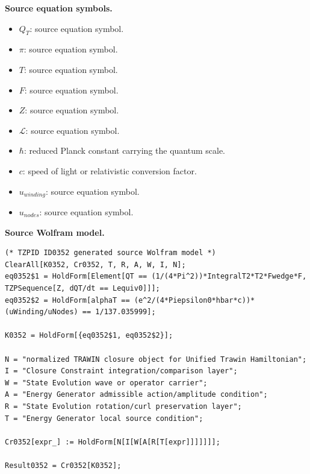 \begin{minipage}[t]{0.49\linewidth}
\begingroup
\small
\raggedright
\textbf{Source equation symbols.}\par
\begin{itemize}[leftmargin=1.35em,itemsep=1pt,topsep=1pt,parsep=0pt]
    \item $Q_T$: source equation symbol.
    \item $\pi$: source equation symbol.
    \item $T$: source equation symbol.
    \item $F$: source equation symbol.
    \item $Z$: source equation symbol.
    \item $\mathcal{L}$: source equation symbol.
    \item $\hbar$: reduced Planck constant carrying the quantum scale.
    \item $c$: speed of light or relativistic conversion factor.
    \item $u_{winding}$: source equation symbol.
    \item $u_{nodes}$: source equation symbol.
\end{itemize}
\endgroup
\end{minipage}\hfill
\begin{minipage}[t]{0.47\linewidth}
\begingroup
\scriptsize
\raggedright
\textbf{Source Wolfram model.}\par
\begin{Verbatim}[fontsize=\tiny,breaklines=true,breakanywhere=true]
(* TZPID ID0352 generated source Wolfram model *)
ClearAll[K0352, Cr0352, T, R, A, W, I, N];
eq0352$1 = HoldForm[Element[QT == (1/(4*Pi^2))*IntegralT2*T2*Fwedge*F, TZPSequence[Z, dQT/dt == Lequiv0]]];
eq0352$2 = HoldForm[alphaT == (e^2/(4*Piepsilon0*hbar*c))*(uWinding/uNodes) == 1/137.035999];

K0352 = HoldForm[{eq0352$1, eq0352$2}];

N = "normalized TRAWIN closure object for Unified Trawin Hamiltonian";
I = "Closure Constraint integration/comparison layer";
W = "State Evolution wave or operator carrier";
A = "Energy Generator admissible action/amplitude condition";
R = "State Evolution rotation/curl preservation layer";
T = "Energy Generator local source condition";

Cr0352[expr_] := HoldForm[N[I[W[A[R[T[expr]]]]]]];

Result0352 = Cr0352[K0352];
\end{Verbatim}
\endgroup
\end{minipage}

